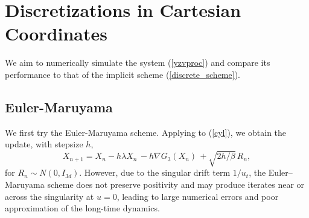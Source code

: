 \documentclass[11pt, twoside]{report}
\begin{document}
\section{Discretizations in Cartesian Coordinates}
We aim to numerically simulate the system (\ref{yzvproc}) and compare its performance to that of the implicit scheme (\ref{discrete_scheme}). 
\subsection{Euler-Maruyama}
We first try the Euler-Maruyama scheme. Applying to (\ref{cyl}), we obtain the update, with stepsize $h$,
\[X_{n+1} = X_n - h\lambda X_n \, - h\nabla G_{3}(X_n)\, + \sqrt{2h/\beta}\,R_n,\]
for $R_n \sim N(0,I_{3d})$. However, due to the singular drift term $1/u_t$, the Euler--Maruyama scheme does not preserve positivity and may produce iterates near or across the singularity at $u=0$, leading to large numerical errors and poor approximation of the long-time dynamics.
\end{document}
